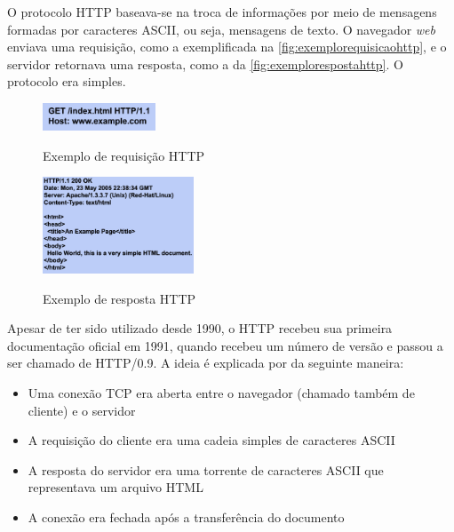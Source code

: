 O protocolo HTTP baseava-se na troca de informações por meio de mensagens formadas por caracteres ASCII, ou seja, mensagens de texto. O navegador \textit{web} enviava uma requisição, como a exemplificada na \autoref{fig:exemplorequisicaohttp}, e o servidor retornava uma resposta, como a da \autoref{fig:exemplorespostahttp}. O protocolo era simples.

\begin{figure}[!htb]
    \centering
    \caption{Exemplo de requisição HTTP}
    \includegraphics[width=0.3\textwidth]{./04-figuras/fund-teorica/http_exemplo_requisicao}
    \label{fig:exemplorequisicaohttp}
\end{figure}

\begin{figure}[!htb]
    \centering
    \caption{Exemplo de resposta HTTP}
    \includegraphics[width=0.4\textwidth]{./04-figuras/fund-teorica/http_exemplo_resposta}
    \label{fig:exemplorespostahttp}
\end{figure}

Apesar de ter sido utilizado desde 1990, o HTTP recebeu sua primeira documentação oficial em 1991, quando recebeu um número de versão e passou a ser chamado de HTTP/0.9. A ideia é explicada por  da seguinte maneira:

\begin{itemize}
	\item Uma conexão TCP era aberta entre o navegador (chamado também de cliente) e o servidor
	\item A requisição do cliente era uma cadeia simples de caracteres ASCII
	\item A resposta do servidor era uma torrente de caracteres ASCII que representava um arquivo HTML
	\item A conexão era fechada após a transferência do documento 
\end{itemize}

